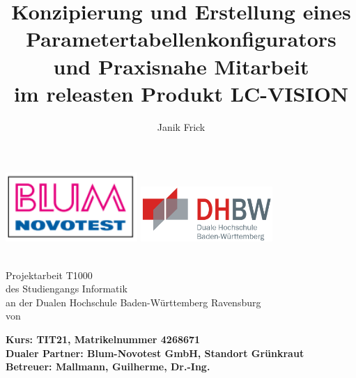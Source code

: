 \documentclass[a4paper,12pt,top=2.5cm,bottom=2.5cm, left=2.5cm, right=2.5cm, numbers=noenddot]{scrartcl}
\author{Janik Frick}
\title{Konzipierung und Erstellung eines Parametertabellenkonfigurators und Praxisnahe Mitarbeit \\[0.4cm]
\noindent im releasten Produkt LC-VISION}
\newcommand{\dualerPartner}{Blum-Novotest GmbH, Standort Grünkraut}
\newcommand{\hochschule}{Dualen Hochschule Baden-Württemberg Ravensburg}
\newcommand{\betreuer}{Mallmann, Guilherme, Dr.-Ing.}
\newcommand{\studiengang}{Informatik}
\newcommand{\kurs}{TIT21, Matrikelnummer 4268671}
\begin{document}


\begin{titlepage}
\includegraphics[width=50mm,scale=1]{blum-logo.PNG}
\hfill
\includegraphics[width=50mm,scale=1]{dhbw.png}
   \begin{center}
       \textbf{\huge{\thetitle}}\\
       \vspace{2.2cm}
       \Large{Projektarbeit T1000\\
       des Studiengangs \studiengang\\
       an der \hochschule\\
       \vspace{1.5cm}
       von\\
       \vspace{0.5cm}
       \theauthor}
       
   \end{center}
       \vspace{1.6cm}
       \noindent
       \vspace{0.3cm}
       \textbf{\large{Kurs: \kurs}}\\
       \vspace{0.3cm}
       \textbf{\large{Dualer Partner: \dualerPartner}}\\
       \vspace{0.3cm}
       \textbf{\large{Betreuer: \betreuer}}
       

\end{titlepage}

\tableofcontents
\newpage
\end{document}
